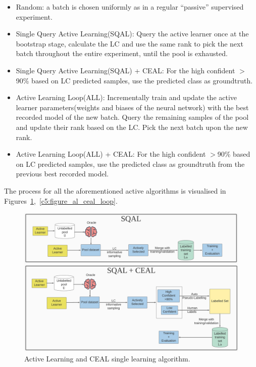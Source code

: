 \begin{itemize}
 \item Random: a batch is chosen uniformly as in a regular ``passive'' supervised experiment.
 \item Single Query Active Learning(SQAL): Query the active learner once at the bootstrap stage, calculate the LC and use the same rank to pick the next batch throughout the entire experiment, until the pool is exhausted.
 \item Single Query Active Learning(SQAL) + CEAL: For the high confident $>$90\% based on LC predicted samples, use the predicted class as groundtruth.
 \item Active Learning Loop(ALL): Incrementally train and update the active learner parameters(weights and biases of the neural network) with the best recorded model of the new batch. Query the remaining samples of the pool and update their rank based on the LC. Pick the next batch upon the new rank.
 \item Active Learning Loop(ALL) + CEAL: For the high confident $>$90\% based on LC predicted samples, use the predicted class as groundtruth from the previous best recorded model.
\end{itemize}

The process for all the aforementioned active algorithms is visualised in Figures~\ref{c5:figure_al_ceal_single},~\ref{c5:figure_al_ceal_loop}.


\begin{figure}[ht!]
    \centering  
    \includegraphics[width=\textwidth]{figures/chap5/al/al_sqal_ceal}
    \caption{Active Learning and CEAL single learning algorithm.}
    \label{c5:figure_al_ceal_single}
\end{figure}

